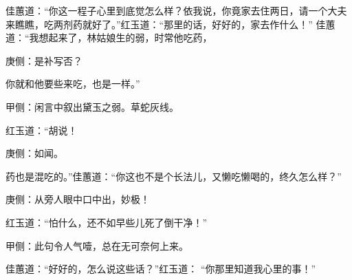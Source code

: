 \begin{parag}
    佳蕙道：“你这一程子心里到底觉怎么样？依我说，你竟家去住两日，请一个大夫来瞧瞧，吃两剂药就好了。”红玉道：“那里的话，好好的，家去作什么！” 佳蕙道：“我想起来了，林姑娘生的弱，时常他吃药，\begin{note}庚侧：是补写否？\end{note}你就和他要些来吃，也是一样。”\begin{note}甲侧：闲言中叙出黛玉之弱。草蛇灰线。\end{note}红玉道：“胡说！\begin{note}庚侧：如闻。\end{note}药也是混吃的。”佳蕙道：“你这也不是个长法儿，又懒吃懒喝的，终久怎么样？”\begin{note}庚侧：从旁人眼中口中出，妙极！\end{note}红玉道：“怕什么，还不如早些儿死了倒干净！”\begin{note}甲侧：此句令人气噎，总在无可奈何上来。\end{note}佳蕙道：“好好的，怎么说这些话？”红玉道： “你那里知道我心里的事！”
\end{parag}


